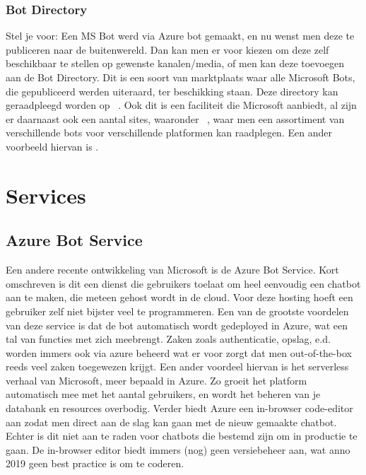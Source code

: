 \subsubsection{Bot Directory}
Stel je voor: Een MS Bot werd via Azure bot gemaakt, en nu wenst men deze te publiceren naar de buitenwereld. Dan kan men er voor kiezen om deze zelf beschikbaar te stellen op gewenste kanalen/media, of men kan deze toevoegen aan de Bot Directory. Dit is een soort van marktplaats waar alle Microsoft Bots, die gepubliceerd werden uiteraard, ter beschikking staan. Deze directory kan geraadpleegd worden op ~\cite{Microsoft2019}. Ook dit is een faciliteit die Microsoft aanbiedt, al  zijn er daarnaast ook een aantal sites, waaronder ~\cite{botfinderio2019}, waar men een assortiment van verschillende bots voor verschillende platformen kan raadplegen. Een ander voorbeeld hiervan is \textcite{Line2019}. 

\section{Services}
\subsection{Azure Bot Service}
Een andere recente ontwikkeling van Microsoft is de Azure Bot Service. Kort omschreven is dit een dienst die gebruikers toelaat om heel eenvoudig een chatbot aan te maken, die meteen gehost wordt in de cloud. Voor deze hosting hoeft een gebruiker zelf niet bijster veel te programmeren. Een van de grootste voordelen van deze service is dat de bot automatisch wordt gedeployed in Azure, wat een tal van functies met zich meebrengt. Zaken zoals authenticatie, opslag, e.d. worden immers ook via azure beheerd wat er voor zorgt dat men out-of-the-box reeds veel zaken toegewezen krijgt. Een ander voordeel hiervan is het serverless verhaal van Microsoft, meer bepaald in Azure. Zo groeit het platform automatisch mee met het aantal gebruikers, en wordt het beheren van je databank en resources overbodig. 
Verder biedt Azure een in-browser code-editor aan zodat men direct aan de slag kan gaan met de nieuw gemaakte chatbot. Echter is dit niet aan te raden voor chatbots die bestemd zijn om in productie te gaan. De in-browser editor biedt immers (nog) geen versiebeheer aan, wat anno 2019 geen best practice is om te coderen. 

